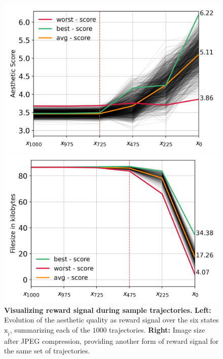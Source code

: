 \begin{figure}[ht]
  \centering
  \begin{minipage}{0.5\textwidth}
      \centering
      \includegraphics[width=1\textwidth]{img/results/1k-trajectories-aestheic-score-single.png} %
  \end{minipage}\hfill
  \begin{minipage}{0.5\textwidth}
      \centering
      \includegraphics[width=1\textwidth]{img/results/1k-trajectories-jpeg-size-single.png} %
  \end{minipage}
  \vspace{-8pt}  %
    \captionsetup{width=\textwidth} %
    \caption{\textbf{Visualizing reward signal during sample trajectories.} \textbf{Left:} Evolution of the aesthetic quality as reward signal over the six states $\mathrm{x}_{\tilde{t}}$, summarizing each of the $1000$ trajectories. \textbf{Right:} Image size after JPEG compression, providing another form of reward signal for the same set of trajectories.}
  \label{fig:samples-trajectory-rewards} %
\end{figure}


